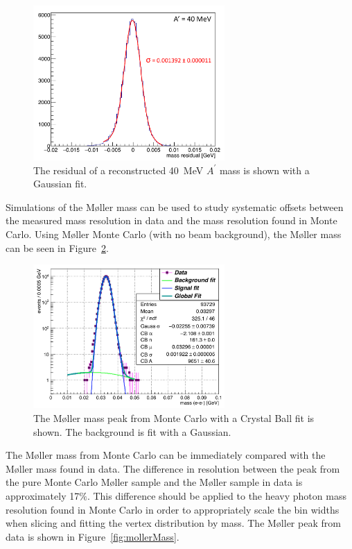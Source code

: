 \begin{figure}[htb]
  \centering
      \includegraphics[width=0.65\textwidth]{pics/searching/ap40mev.png}
  \caption[Fit to the mass residual of a 40~MeV $A^{\prime}$]{The residual of a reconstructed 40~MeV $A^{\prime}$ mass is shown with a Gaussian fit.}
  \label{fig:ap40mev}
\end{figure} 

Simulations of the M\o ller mass can be used to study systematic offsets between the measured mass resolution in data and the mass resolution found in Monte Carlo. Using M\o ller Monte Carlo (with no beam background), the M\o ller mass can be seen in Figure~\ref{fig:mollerMC}. 

\begin{figure}[htb]
  \centering
      \includegraphics[width=0.65\textwidth]{pics/searching/mollerMassMC.png}
  \caption[Fit to the M\o ller mass peak in Monte Carlo]{The M\o ller mass peak from Monte Carlo with a Crystal Ball fit is shown. The background is fit with a Gaussian.}
  \label{fig:mollerMC}
\end{figure} 

The M\o ller mass from Monte Carlo can be immediately compared with the M\o ller mass found in data. The difference in resolution between the peak from the pure Monte Carlo M\o ller sample and the M\o ller sample in data is approximately 17$\%$. This difference should be applied to the heavy photon mass resolution found in Monte Carlo in order to appropriately scale the bin widths when slicing and fitting the vertex distribution by mass. The M\o ller peak from data is shown in Figure~\ref{fig:mollerMass}. 

